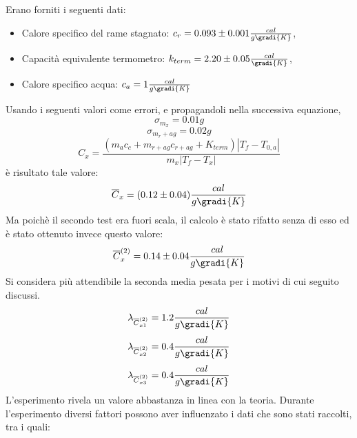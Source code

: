 Erano forniti i seguenti dati:
\begin{itemize}
 \item Calore specifico del rame stagnato: $c_r = 0.093 \pm  0.001 \frac{cal}{g \gradi{K}}$,
 \item Capacità equivalente termometro: $k_{term} = 2.20 \pm 0.05 \frac{cal}{\gradi{K}}$,
 \item Calore specifico acqua: $c_a = 1 \frac{cal}{g \gradi{K}}$
\end{itemize}
Usando i seguenti valori come errori, e propagandoli nella successiva equazione,
\[\sigma _{m_x} = 0.01 g \]
\[\sigma_{m_r+ag} = 0.02 g \]
\begin{equation}
 C_x = \frac{(m_a c_c + m_{r+ag} c_{r+ag} + K_{term}) |T_f - T_{0,a}|}{m_x |T_f - T_x|}
\end{equation}
è risultato tale valore:
\begin{equation}
\overline{C}_x = (0.12 \pm 0.04) \frac{cal}{g \gradi{K}}
\end{equation}
Ma poichè il secondo test era fuori scala, il calcolo è stato rifatto senza di esso ed è stato ottenuto invece questo valore:
\begin{equation}
  \overline{C}_x^{(2)} = 0.14 \pm 0.04 \frac{cal}{g \gradi{K}}
\end{equation}
Si considera più attendibile la seconda media pesata per i motivi di cui seguito discussi.
\[\lambda_{\overline{C}^{(2)}_{x1}} = 1.2 \frac{cal}{g \gradi{K}} \]
\[\lambda_{\overline{C}^{(2)}_{x2}} = 0.4 \frac{cal}{g \gradi{K}} \]
\[\lambda_{\overline{C}^{(2)}_{x3}} = 0.4 \frac{cal}{g \gradi{K}} \]
L'esperimento rivela un valore abbastanza in linea con la teoria. Durante l'esperimento diversi fattori
possono aver influenzato i dati che sono stati raccolti, tra i quali:

